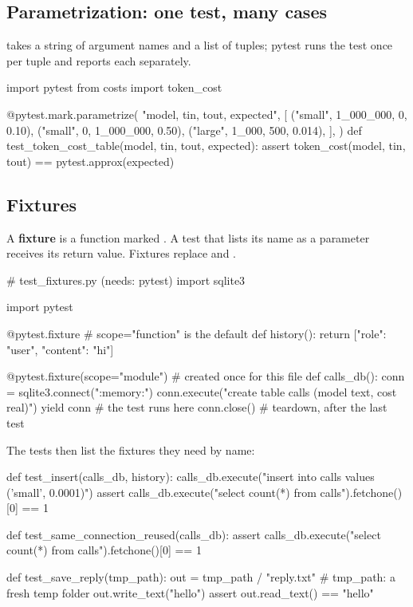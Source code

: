 \subsection{Parametrization: one test, many cases}

 takes a string of argument names and a list of tuples; pytest runs the test once per tuple and reports
each separately.

\begin{pycode}
import pytest
from costs import token_cost

@pytest.mark.parametrize(
    "model, tin, tout, expected",
    [
        ("small", 1_000_000, 0, 0.10),
        ("small", 0, 1_000_000, 0.50),
        ("large", 1_000, 500, 0.014),
    ],
)
def test_token_cost_table(model, tin, tout, expected):
    assert token_cost(model, tin, tout) == pytest.approx(expected)
\end{pycode}

\subsection{Fixtures}

A \textbf{fixture} is a function marked . A test that lists its name as a parameter receives
its return value. Fixtures replace  and .

\begin{pycode}
# test_fixtures.py   (needs: pytest)
import sqlite3

import pytest


@pytest.fixture                      # scope="function" is the default
def history():
    return [{"role": "user", "content": "hi"}]


@pytest.fixture(scope="module")      # created once for this file
def calls_db():
    conn = sqlite3.connect(":memory:")
    conn.execute("create table calls (model text, cost real)")
    yield conn                       # the test runs here
    conn.close()                     # teardown, after the last test
\end{pycode}
The tests then list the fixtures they need by name:
\begin{pycode}
def test_insert(calls_db, history):
    calls_db.execute("insert into calls values ('small', 0.0001)")
    assert calls_db.execute("select count(*) from calls").fetchone()[0] == 1


def test_same_connection_reused(calls_db):
    assert calls_db.execute("select count(*) from calls").fetchone()[0] == 1


def test_save_reply(tmp_path):
    out = tmp_path / "reply.txt"     # tmp_path: a fresh temp folder
    out.write_text("hello")
    assert out.read_text() == "hello"
\end{pycode}

